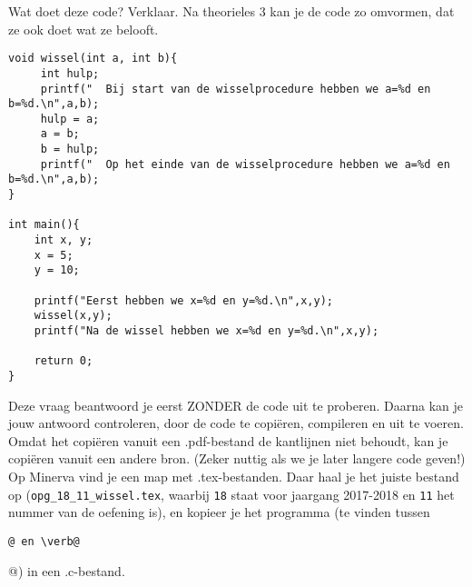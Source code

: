 \beginoef
%
Wat doet deze code? Verklaar. Na theorieles 3 kan je de code zo omvormen, dat ze ook doet wat ze belooft.
\begin{footnotesize}
\begin{verbatim}
void wissel(int a, int b){
     int hulp;
     printf("  Bij start van de wisselprocedure hebben we a=%d en b=%d.\n",a,b);   
     hulp = a;
     a = b;
     b = hulp;  
     printf("  Op het einde van de wisselprocedure hebben we a=%d en b=%d.\n",a,b);   
}

int main(){
    int x, y;
    x = 5;
    y = 10;
    
    printf("Eerst hebben we x=%d en y=%d.\n",x,y);  
    wissel(x,y);    
    printf("Na de wissel hebben we x=%d en y=%d.\n",x,y);    
        
    return 0;  
}
\end{verbatim}
\end{footnotesize}
Deze vraag beantwoord je eerst ZONDER de code uit te proberen. Daarna kan je jouw antwoord controleren, door de code te copi\"eren, compileren en uit te voeren. Omdat het copi\"eren vanuit een .pdf-bestand de kantlijnen niet behoudt, kan je copi\"eren vanuit een andere bron. (Zeker nuttig als we je later langere code geven!) Op Minerva vind je een map met .tex-bestanden. Daar haal je het juiste bestand op (\verb}opg_18_11_wissel.tex}, waarbij \verb}18} staat voor jaargang 2017-2018 en \verb}11} het nummer van de oefening is), en kopieer je het programma (te vinden tussen \verb@\begin{verbatim}@ en \verb@\end{verbatim}@) in een .c-bestand.
\endoef

